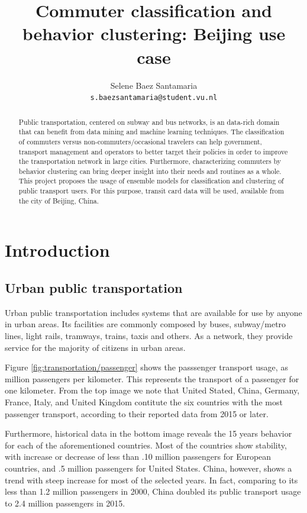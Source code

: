 \documentclass{article}
\title{Commuter classification and behavior clustering: Beijing use case}
\author{
  Selene Baez  Santamaria \\
  \texttt{s.baezsantamaria@student.vu.nl}
}
\begin{document}

\maketitle

\begin{abstract}
  Public transportation, centered on subway and bus networks, is an data-rich domain that can benefit from data mining and machine learning techniques. The classification of commuters versus non-commuters/occasional travelers can help government, transport management and operators to better target their policies in order to improve the transportation network in large cities. Furthermore, characterizing commuters by behavior clustering can bring deeper insight into their needs and routines as a whole. 
  This project proposes the usage of ensemble models for classification and clustering of public transport users. For this purpose, transit card data will be used, available from the city of Beijing, China. 
\end{abstract}

\newpage

\tableofcontents

\newpage
\section{Introduction}

\subsection{Urban public transportation}
Urban public transportation includes systems that are available for use by anyone in urban areas. Its facilities are commonly composed by buses, subway/metro lines, light rails, tramways, trains, taxis and others. As a network, they provide service for the majority of citizens in urban areas.\citep{vuchic1900urban}

Figure \ref{fig:transportation/passenger} shows the passsenger transport usage, as million passengers per kilometer. This represents the transport of a passenger for one kilometer. From the top image we note that United Stated, China, Germany, France, Italy, and United Kingdom contitute the six countries with the most passenger transport, according to their reported data from 2015 or later.\cite{OECD2017passenger} 

Furthermore, historical data in the bottom image reveals the 15 years behavior for each of the aforementioned countries. Most of the countries show stability, with increase or decrease of less than .10 million passengers for European countries, and .5 million passengers for United States. China, however, shows a trend with steep increase for most of the selected years. In fact, comparing to its less than 1.2 million passengers in 2000, China doubled its public transport usage to 2.4 million passengers in 2015. 
\end{document}
